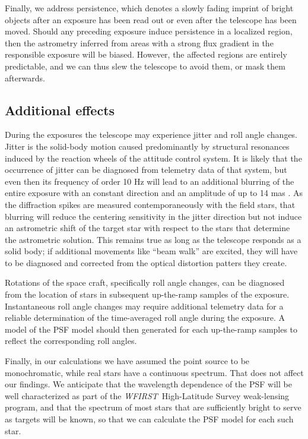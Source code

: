 \documentclass[modern, times]{aastex61}
\newcommand\wfirst{\textit{WFIRST}}
\begin{document}
Finally, we address persistence, which denotes a slowly fading imprint of bright objects after an exposure has been read out or even after the telescope has been moved.
Should any preceding exposure induce persistence in a localized region, then the astrometry inferred from areas with a strong flux gradient in the responsible exposure will be biased.
However, the affected regions are entirely predictable, and we can thus slew the telescope to avoid them, or mask them afterwards.

\subsection{Additional effects}

During the exposures the telescope may experience jitter and roll angle changes.
Jitter is the solid-body motion caused predominantly by structural resonances induced by the reaction wheels of the attitude control system.
It is likely that the occurrence of jitter can be diagnosed from telemetry data of that system, but even then its frequency of order 10 Hz will lead to an additional blurring of the entire exposure with an constant direction and an amplitude of up to 14 mas \citep{Spergel2015}.  
As the diffraction spikes are measured contemporaneously with the field stars, that blurring will reduce the centering sensitivity in the jitter direction but not induce an astrometric shift of the target star with respect to the stars that determine the astrometric solution.
This remains true as long as the telescope responds as a solid body; if additional movements like ``beam walk'' are excited, they will have to be diagnosed and corrected from the optical distortion patters they create.  

Rotations of the space craft, specifically roll angle changes, can be diagnosed from the location of stars in subsequent up-the-ramp samples of the exposure.
Instantaneous roll angle changes \citep[their section 2.4.6]{Riess2014} may require additional telemetry data for a reliable determination of the time-averaged roll angle during the exposure.
A model of the PSF model should then generated for each up-the-ramp samples to reflect the corresponding roll angles.  

Finally, in our calculations we have assumed the point source to be monochromatic, while real stars have a continuous spectrum.
That does not affect our findings.
We anticipate that the wavelength dependence of the PSF will be well characterized as part of the \wfirst\ High-Latitude Survey weak-lensing program, and that the spectrum of most stars that are sufficiently bright to serve as targets will be known, so that we can calculate the PSF model for each such star.
\end{document}
